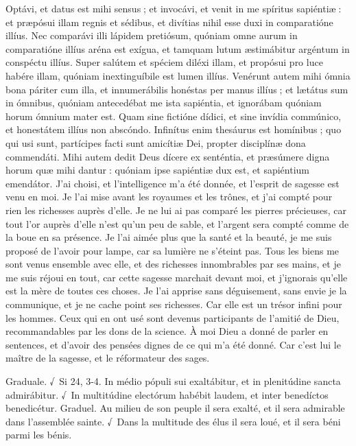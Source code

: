 \begin{paracol}{2}
Optávi, et datus est mihi sensus ; et invocávi, et venit in me spíritus sapiéntiæ : et præpósui illam regnis et sédibus, et divítias nihil esse duxi in comparatióne illíus. Nec comparávi illi lápidem pretiósum, quóniam omne aurum in comparatióne illíus aréna est exígua, et tamquam lutum æstimábitur argéntum in conspéctu illíus. Super salútem et spéciem diléxi illam, et propósui pro luce habére illam, quóniam inextinguíbile est lumen illíus. Venérunt autem mihi ómnia bona páriter cum illa, et innumerábilis honéstas per manus illíus ; et lætátus sum in ómnibus, quóniam antecedébat me ista sapiéntia, et ignorábam quóniam horum ómnium mater est. Quam sine fictióne dídici, et sine invídia commúnico, et honestátem illíus non abscóndo. Infinítus enim thesáurus est homínibus ; quo qui usi sunt, partícipes facti sunt amicítiæ Dei, propter disciplínæ dona commendáti. Mihi autem dedit Deus dícere ex senténtia, et præsúmere digna horum quæ mihi dantur : quóniam ipse sapiéntiæ dux est, et sapiéntium emendátor.
\switchcolumn
J’ai choisi, et l’intelligence m’a été donnée, et l’esprit de sagesse est venu en moi. Je l’ai mise avant les royaumes et les trônes, et j’ai compté pour rien les richesses auprès d’elle. Je ne lui ai pas comparé les pierres précieuses, car tout l’or auprès d’elle n’est qu’un peu de sable, et l’argent sera compté comme de la boue en sa présence. Je l’ai aimée plus que la santé et la beauté, je me suis proposé de l’avoir pour lampe, car sa lumière ne s’éteint pas. Tous les biens me sont venus ensemble avec elle, et des richesses innombrables par ses mains, et je me suis réjoui en tout, car cette sagesse marchait devant moi, et j’ignorais qu’elle est la mère de toutes ces choses. Je l’ai apprise sans déguisement, sans envie je la communique, et je ne cache point ses richesses. Car elle est un trésor infini pour les hommes. Ceux qui en ont usé sont devenus participants de l’amitié de Dieu, recommandables par les dons de la science. À moi Dieu a donné de parler en sentences, et d’avoir des pensées dignes de ce qui m’a été donné. Car c’est lui le maître de la sagesse, et le réformateur des sages.
\switchcolumn*

Graduale. √~Si 24, 3-4. In médio pópuli sui exaltábitur, et in plenitúdine sancta admirábitur. √~In multitúdine electórum habébit laudem, et inter benedíctos benedicétur.
\switchcolumn
Graduel. Au milieu de son peuple il sera exalté, et il sera admirable dans l’assemblée sainte. √~Dans la multitude des élus il sera loué, et il sera béni parmi les bénis.
\switchcolumn*


\end{paracol}
